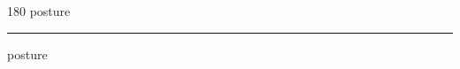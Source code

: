 
\begin{frame}
\begin{center}
\begin{turn}{180}
{\fontsize{2.5cm}{1em}\selectfont posture}
\end{turn}
\vspace{1em}\par  
\hrule
\vspace{1em}\par  
{\fontsize{2.5cm}{1em}\selectfont posture}
\end{center}
\end{frame}
